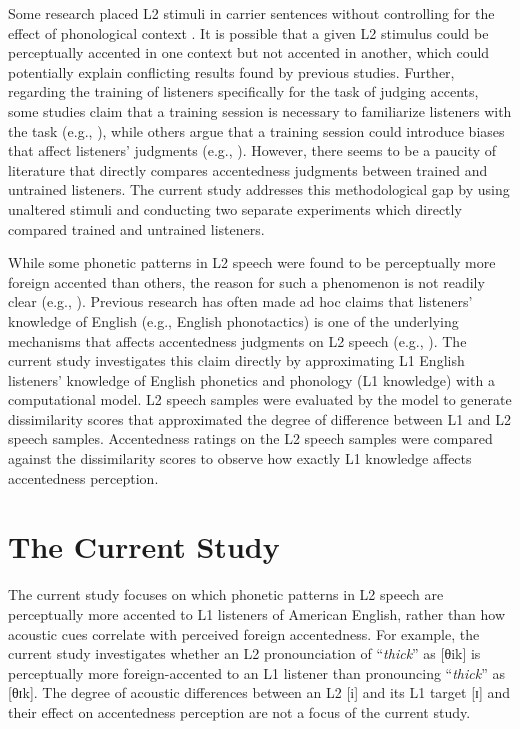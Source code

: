 Some research placed L2 stimuli in carrier sentences without controlling for the effect of phonological context \citep{Magen_1998, van_den_Doel_2006}. It is possible that a given L2 stimulus could be perceptually accented in one context but not accented in another, which could potentially explain conflicting results found by previous studies. Further, regarding the training of listeners specifically for the task of judging accents, some studies claim that a training session is necessary to familiarize listeners with the task (e.g., \citealp{Major_1986}), while others argue that a training session could introduce biases that affect listeners' judgments (e.g., \citealp{McDermott_1986}). However, there seems to be a paucity of literature that directly compares accentedness judgments between trained and untrained listeners. The current study addresses this methodological gap by using unaltered stimuli and conducting two separate experiments which directly compared trained and untrained listeners. 

While some phonetic patterns in L2 speech were found to be perceptually more foreign accented than others, the reason for such a phenomenon is not readily clear (e.g., \citealp{Magen_1998}). Previous research has often made ad hoc claims that listeners’ knowledge of English (e.g., English phonotactics) is one of the underlying mechanisms that affects accentedness judgments on L2 speech (e.g., \citealp{Park_2013}). The current study investigates this claim directly by approximating L1 English listeners’ knowledge of English phonetics and phonology (L1 knowledge) with a computational model. L2 speech samples were evaluated by the model to generate dissimilarity scores that approximated the degree of difference between L1 and L2 speech samples. Accentedness ratings on the L2 speech samples were compared against the dissimilarity scores to observe how exactly L1 knowledge affects accentedness perception.

\section{The Current Study}

The current study focuses on which phonetic patterns in L2 speech are perceptually more accented to L1 listeners of American English, rather than how acoustic cues correlate with perceived foreign accentedness. For example, the current study investigates whether an L2 pronounciation of “\textit{thick}” as [θik] is perceptually more foreign-accented to an L1 listener than pronouncing “\textit{thick}” as [θɪk]. The degree of acoustic differences between an L2 [i] and its L1 target [ɪ] and their effect on  accentedness perception are not a focus of the current study. 

